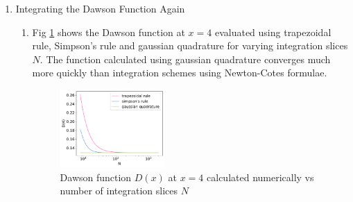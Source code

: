 \documentclass{article}
\begin{document}
\begin{enumerate}
\begin{enumerate}
    The raw output from the code is:
\begin{verbatim}
1 c) derivatives using optimal h from part b: 
    m       optimal h                h=0.05
    1:      2.0000000000234888       2.000833437506202
    2:      4.000001933007014        4.003334444642892
    3:      7.77155789571232         8.010005418359611
    4:      -221126.08039335813      6.02668667564089
    5:      8258210993.557659        32.06673059601428
    6:      2.2204420456714464e+16   64.16018684518576
    7:      -3.68559504405105e+20    128.37384304020816
    8:      -2.1195518363153336e+27  256.8546079828593
    9:      2.05607099203305e+31     513.9293079992058
    10:     1.971716534777767e+38    1028.4099971613614
\end{verbatim}
\end{enumerate}

\item Integrating the Dawson Function Again
\begin{enumerate}
  \item Fig \ref{fig:2a} shows the Dawson function at $x=4$ evaluated using trapezoidal rule, Simpson's rule and gaussian quadrature for varying integration slices $N$. 
  The function calculated using gaussian quadrature converges much more quickly than integration schemes using Newton-Cotes formulae.
  \begin{figure}[h]
    \centering 
    \includegraphics[width=0.4\textwidth]{Q2a.pdf}
    \caption{Dawson function $D(x)$ at $x=4$ calculated numerically vs number of integration slices $N$}
    \label{fig:2a}
  \end{figure}


\end{enumerate}
\end{enumerate}
\end{document}
